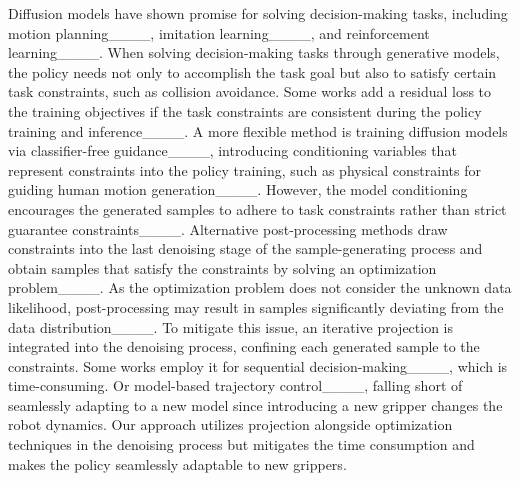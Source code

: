 Diffusion models have shown promise for solving decision-making tasks, including motion planning____, imitation learning____, and reinforcement learning____. When solving decision-making tasks through generative models, the policy needs not only to accomplish the task goal but also to satisfy certain task constraints, such as collision avoidance. Some works add a residual loss to the training objectives if the task constraints are consistent during the policy training and inference____. A more flexible method is training diffusion models via classifier-free guidance____, introducing conditioning variables that represent constraints into the policy training, such as physical constraints for guiding human motion generation____. However, the model conditioning encourages the generated samples to adhere to task constraints rather than strict guarantee constraints____. Alternative post-processing methods draw constraints into the last denoising stage of the sample-generating process and obtain samples that satisfy the constraints by solving an optimization problem____. As the optimization problem does not consider the unknown data likelihood, post-processing may result in samples significantly deviating from the data distribution____. To mitigate this issue, an iterative projection is integrated into the denoising process, confining each generated sample to the constraints. Some works employ it for sequential decision-making____, which is time-consuming. Or model-based trajectory control____, falling short of seamlessly adapting to a new model since introducing a new gripper changes the robot dynamics. Our approach utilizes projection alongside optimization techniques in the denoising process but mitigates the time consumption and makes the policy seamlessly adaptable to new grippers.